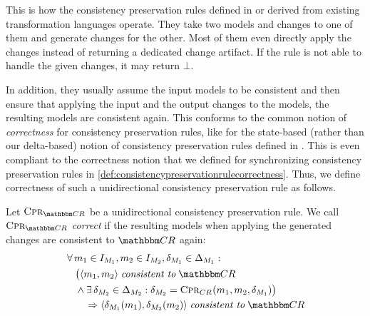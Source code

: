 This is how the consistency preservation rules defined in or derived from existing transformation languages operate.
They take two models and changes to one of them and generate changes for the other.
Most of them even directly apply the changes instead of returning a dedicated change artifact.
If the rule is not able to handle the given changes, it may return $\bot$.

In addition, they usually assume the input models to be consistent and then ensure that applying the input and the output changes to the models, the resulting models are consistent again.
This conforms to the common notion of \emph{correctness} for consistency preservation rules, like for the state-based (rather than our delta-based) notion of consistency preservation rules defined in \cite{stevens2010sosym}.
This is even compliant to the correctness notion that we defined for synchronizing consistency preservation rules in \autoref{def:consistencypreservationrulecorrectness}.
Thus, we define correctness of such a unidirectional consistency preservation rule as follows.

\begin{definition}
    \label{def:unidirectionalconsistencypreservationrulecorrectness}
    Let $\consistencypreservationrule{\consistencyrelationset{CR}}$ be a unidirectional consistency preservation rule.
    We call $\consistencypreservationrule{\consistencyrelationset{CR}}$ \emph{correct} if the resulting models when applying the generated changes are consistent to $\consistencyrelationset{CR}$ again:
    \begin{align*}
        &
        \forall 
        \model{m}{1} \in \metamodelinstanceset{M}{1}, 
        \model{m}{2} \in \metamodelinstanceset{M}{2},
        \change{\metamodel{M}{1}} \in \changeuniverse{\metamodel{M}{1}} : \\
        & \formulaskip
        \bigl( \tupled{\model{m}{1}, \model{m}{2}} \consistenttomath \consistencyrelationset{CR} \\
        & \formulaskip
        \land \exists 
        \change{\metamodel{M}{2}} \in \changeuniverse{\metamodel{M}{2}} :
        \change{\metamodel{M}{2}} = \consistencypreservationrule{\consistencyrelation{CR}{}}(\model{m}{1}, \model{m}{2}, \change{\metamodel{M}{1}}) \bigr) \\
        & \formulaskip\formulaskip
        \Rightarrow
        \tupled{\change{\metamodel{M}{1}}(\model{m}{1}), \change{\metamodel{M}{2}}(\model{m}{2})} \consistenttomath \consistencyrelationset{CR}
    \end{align*}
\end{definition}

